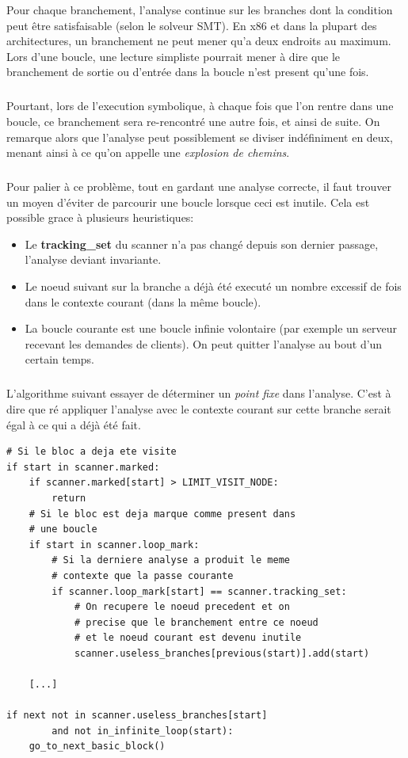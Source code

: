 Pour chaque branchement, l'analyse continue sur les branches dont la condition peut être satisfaisable (selon le solveur SMT). En x86 et dans la plupart des architectures,
un branchement ne peut mener qu'a deux endroits au maximum. Lors d'une boucle, une lecture simpliste pourrait mener à dire que le branchement de sortie ou d'entrée dans la boucle n'est present qu'une fois.
\subparagraph{}
Pourtant, lors de l'execution symbolique, à chaque fois que l'on rentre dans une boucle, ce branchement sera re-rencontré une autre fois, et ainsi de suite.
On remarque alors que l'analyse peut possiblement se diviser indéfiniment en deux, menant ainsi à ce qu'on appelle une \textit{explosion de chemins}.
\subparagraph{}
Pour palier à ce problème, tout en gardant une analyse correcte, il faut trouver un moyen d'éviter de parcourir une boucle lorsque ceci est inutile. Cela est possible grace à plusieurs heuristiques:
\begin{itemize}
    \item Le \textbf{tracking\_set} du scanner n'a pas changé depuis son dernier passage, l'analyse deviant invariante.
    \item Le noeud suivant sur la branche a déjà été executé un nombre excessif de fois dans le contexte courant (dans la même boucle).
    \item La boucle courante est une boucle infinie volontaire (par exemple un serveur recevant les demandes de clients). On peut quitter l'analyse au bout d'un certain temps.
\end{itemize}
\subparagraph{}
L'algorithme suivant essayer de déterminer un \textit{point fixe} dans l'analyse. C'est à dire que ré appliquer l'analyse avec le contexte courant sur cette branche serait
égal à ce qui a déjà été fait.
\begin {lstlisting}[frame=single]
# Si le bloc a deja ete visite
if start in scanner.marked:
    if scanner.marked[start] > LIMIT_VISIT_NODE:
        return
    # Si le bloc est deja marque comme present dans
    # une boucle
    if start in scanner.loop_mark:
        # Si la derniere analyse a produit le meme
        # contexte que la passe courante
        if scanner.loop_mark[start] == scanner.tracking_set:
            # On recupere le noeud precedent et on
            # precise que le branchement entre ce noeud
            # et le noeud courant est devenu inutile
            scanner.useless_branches[previous(start)].add(start)

    [...]

if next not in scanner.useless_branches[start]
        and not in_infinite_loop(start):
    go_to_next_basic_block()
\end{lstlisting}
